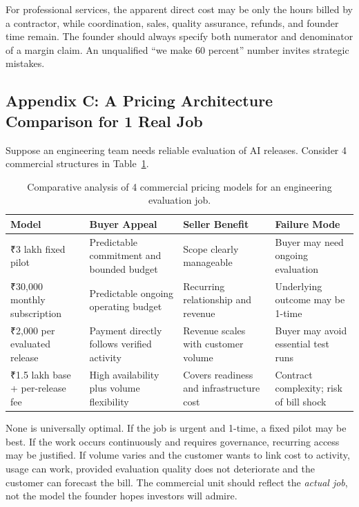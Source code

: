 For professional services, the apparent direct cost may be only the hours billed by a contractor, while coordination, sales, quality assurance, refunds, and founder time remain. The founder should always specify both numerator and denominator of a margin claim. An unqualified ``we make 60 percent'' number invites strategic mistakes.

\subsection*{Appendix C: A Pricing Architecture Comparison for 1 Real Job}

Suppose an engineering team needs reliable evaluation of AI releases. Consider 4 commercial structures in Table~\ref{tab:pricing-model-comparison}.

\begin{table}[htbp]
\centering
\small
\begin{tabularx}{\textwidth}{p{3.2cm}XXX}
\toprule
\textbf{Model} & \textbf{Buyer Appeal} & \textbf{Seller Benefit} & \textbf{Failure Mode} \\
\midrule
₹3 lakh fixed pilot & Predictable commitment and bounded budget & Scope clearly manageable & Buyer may need ongoing evaluation \\
\addlinespace
₹30,000 monthly subscription & Predictable ongoing operating budget & Recurring relationship and revenue & Underlying outcome may be 1-time \\
\addlinespace
₹2,000 per evaluated release & Payment directly follows verified activity & Revenue scales with customer volume & Buyer may avoid essential test runs \\
\addlinespace
₹1.5 lakh base + per-release fee & High availability plus volume flexibility & Covers readiness and infrastructure cost & Contract complexity; risk of bill shock \\
\bottomrule
\end{tabularx}
\caption{Comparative analysis of 4 commercial pricing models for an engineering evaluation job.}
\label{tab:pricing-model-comparison}
\end{table}

None is universally optimal. If the job is urgent and 1-time, a fixed pilot may be best. If the work occurs continuously and requires governance, recurring access may be justified. If volume varies and the customer wants to link cost to activity, usage can work, provided evaluation quality does not deteriorate and the customer can forecast the bill. The commercial unit should reflect the \emph{actual job}, not the model the founder hopes investors will admire.

